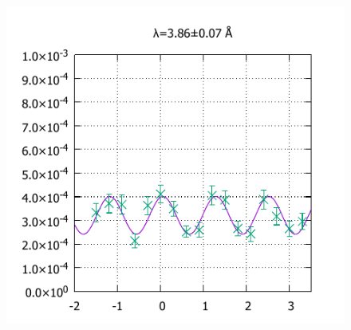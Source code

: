\begin{figure}[H]
\begin{minipage}{0.33\hsize}
\includegraphics[width=\imgwidth]{phase_shifter/wl/wlf7.pdf}
\end{minipage}
\end{figure}
